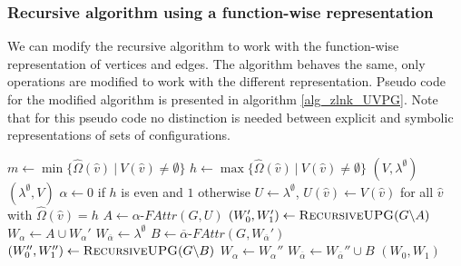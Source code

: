 \subsubsection{Recursive algorithm using a function-wise representation}
We can modify the recursive algorithm to work with the function-wise representation of vertices and edges. The algorithm behaves the same, only operations are modified to work with the different representation.  Pseudo code for the modified algorithm is presented in algorithm \ref{alg_zlnk_UVPG}. Note that for this pseudo code no distinction is needed between explicit and symbolic representations of sets of configurations.
\begin{algorithm}
	\caption{$\textsc{RecursiveUPG}(\textit{parity game } G = (\\
		V : \hat{V} \rightarrow 2^\mathfrak{C},\\
		\hat{V}_0 \subseteq \hat{V},\\
		\hat{V}_1 \subseteq \hat{V},\\
		E : \hat{E} \rightarrow 2^\mathfrak{C},\\
		\hat{\Omega} : \hat{V}\rightarrow \mathbb{N}))$}\label{alg_zlnk_UVPG}
	\begin{algorithmic}[1]
		\State $m \gets \min\{ \hat{\Omega}(\hat{v})\ |\ V(\hat{v}) \neq \emptyset \}$
		\State $h \gets \max\{ \hat{\Omega}(\hat{v})\ |\ V(\hat{v}) \neq \emptyset \}$
		\State \Return $(V,\lambda^\emptyset)$
		\Else
		\State \Return $(\lambda^\emptyset, V)$
		\EndIf
		\EndIf
		\State $\alpha \gets 0$ if $h$ is even and $1$ otherwise
		\State $U \gets \lambda^\emptyset$, $U(\hat{v}) \gets V(\hat{v})$ for all $\hat{v}$ with $\hat{\Omega}(\hat{v}) = h$
		\State $A \gets \alpha\textit{-FAttr}(G, U)$
		\State $(W_0', W_1') \gets \textsc{RecursiveUPG}(G \backslash A)$
		\State $W_\alpha \gets A \cup W_\alpha'$
		\State $W_{\overline{\alpha}} \gets \lambda^\emptyset$
		\Else
		\State $B \gets \overline{\alpha}\textit{-FAttr}(G,W_{\overline{\alpha}}')$
		\State $(W_0'', W_1'') \gets \textsc{RecursiveUPG}(G \backslash B)$
		\State $W_\alpha \gets W_\alpha''$
		\State $W_{\overline{\alpha}} \gets W_{\overline{\alpha}}'' \cup B$
		\EndIf
		\State \Return $(W_0, W_1)$
	\end{algorithmic}
\end{algorithm}

